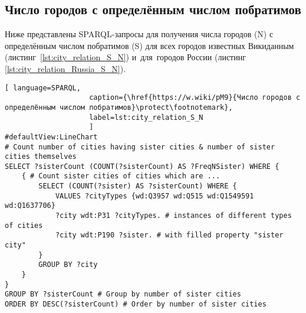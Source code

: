 \subsection{Число городов с определённым числом побратимов}
%

Ниже представлены SPARQL-запросы для получения числа городов (N) 
с определённым числом побратимов (S) для всех городов известных Викиданным 
(листинг~\ref{lst:city_relation_S_N}) и~для~городов России (листинг \ref{lst:city_relation_Russia_S_N}).

\begin{lstlisting}[ language=SPARQL, 
                    caption={\href{https://w.wiki/pM9}{Число городов с определённым числом побратимов}\protect\footnotemark},
                    label=lst:city_relation_S_N
                    ]
#defaultView:LineChart
# Count number of cities having sister cities & number of sister cities themselves
SELECT ?sisterCount (COUNT(?sisterCount) AS ?FreqNSister) WHERE {                                                                         
	{ # Count sister cities of cities which are ...
		SELECT (COUNT(?sister) AS ?sisterCount) WHERE {        
			VALUES ?cityTypes {wd:Q3957 wd:Q515 wd:Q1549591 wd:Q1637706}
			?city wdt:P31 ?cityTypes. # instances of different types of cities
			?city wdt:P190 ?sister. # with filled property "sister city"
		}
		GROUP BY ?city
	}
}
GROUP BY ?sisterCount # Group by number of sister cities                                     
ORDER BY DESC(?sisterCount) # Order by number of sister cities   
\end{lstlisting}

